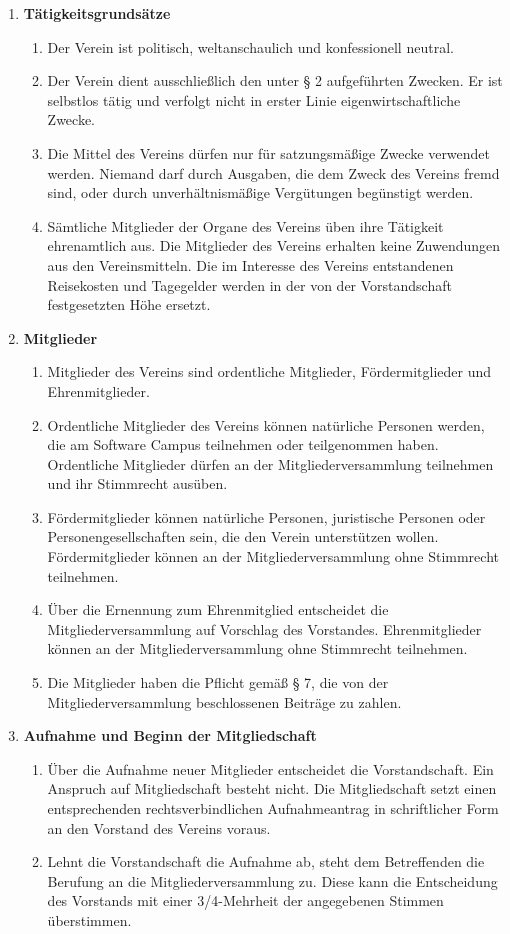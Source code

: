 \documentclass{article}
\begin{document}
\begin{enumerate}[§ 1.]
\item \textsf{\textbf{Tätigkeitsgrundsätze}}
	\begin{enumerate}[1.]
	\item Der Verein ist politisch, weltanschaulich und konfessionell neutral.
	\item Der Verein dient ausschließlich den unter § 2 aufgeführten Zwecken. Er ist
selbstlos tätig und verfolgt nicht in erster Linie eigenwirtschaftliche Zwecke.
	\item Die Mittel des Vereins dürfen nur für satzungsmäßige Zwecke verwendet werden.
Niemand darf durch Ausgaben, die dem Zweck des Vereins fremd sind, oder durch
unverhältnismäßige Vergütungen begünstigt werden.
	\item Sämtliche Mitglieder der Organe des Vereins üben ihre Tätigkeit ehrenamtlich aus.
Die Mitglieder des Vereins erhalten keine Zuwendungen aus den Vereinsmitteln.
Die im Interesse des Vereins entstandenen Reisekosten und Tagegelder werden
in der von der Vorstandschaft festgesetzten Höhe ersetzt.
	\end{enumerate}

\item \textsf{\textbf{Mitglieder}}
	\begin{enumerate}[1.]
	\item Mitglieder des Vereins sind ordentliche Mitglieder, Fördermitglieder und
Ehrenmitglieder.
	\item Ordentliche Mitglieder des Vereins können natürliche Personen werden, die am
Software Campus teilnehmen oder teilgenommen haben.
Ordentliche Mitglieder
dürfen an der Mitgliederversammlung teilnehmen und ihr Stimmrecht ausüben.
	\item Fördermitglieder können natürliche Personen, juristische Personen oder
Personengesellschaften sein, die den Verein unterstützen wollen. Fördermitglieder
können an der Mitgliederversammlung ohne Stimmrecht teilnehmen.
	\item Über die Ernennung zum Ehrenmitglied entscheidet die Mitgliederversammlung auf Vorschlag des Vorstandes.
Ehrenmitglieder können an der Mitgliederversammlung ohne Stimmrecht teilnehmen.
	\item Die Mitglieder haben die Pflicht gemäß § 7, die von der Mitgliederversammlung
beschlossenen Beiträge zu zahlen.
	\end{enumerate}

\item \textsf{\textbf{Aufnahme und Beginn der Mitgliedschaft}}
	\begin{enumerate}[1.]
	\item Über die Aufnahme neuer Mitglieder entscheidet die Vorstandschaft. Ein Anspruch
auf Mitgliedschaft besteht nicht. Die Mitgliedschaft setzt einen entsprechenden
rechtsverbindlichen Aufnahmeantrag in schriftlicher Form an den Vorstand des
Vereins voraus.
	\item Lehnt die Vorstandschaft die Aufnahme ab, steht dem Betreffenden die Berufung
an die Mitgliederversammlung zu. Diese kann die Entscheidung des Vorstands mit
einer 3/4-Mehrheit der angegebenen Stimmen überstimmen.
	\end{enumerate}


\end{enumerate}
\end{document}
